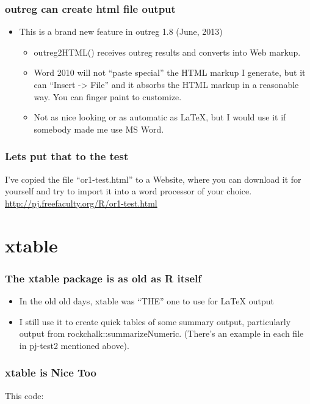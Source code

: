\documentclass[11pt,english]{beamer}
\def\lyxframeend{} %
\begin{document}
\begin{frame}
\frametitle{outreg can create html file output}
\begin{itemize}
\item This is a brand new feature in outreg 1.8 (June, 2013)

\begin{itemize}
\item outreg2HTML() receives outreg results and converts into Web markup.
\item Word 2010 will not ``paste special'' the HTML markup I generate,
but it can ``Insert -> File'' and it absorbs the HTML markup in
a reasonable way. You can finger paint to customize.
\item Not as nice looking or as automatic as \LaTeX{}, but I would use it
if somebody made me use MS Word.
\end{itemize}
\end{itemize}
\end{frame}

\begin{frame}
\frametitle{Lets put that to the test}



I've copied the file ``or1-test.html'' to a Website, where you can
download it for yourself and try to import it into a word processor
of your choice. \href{http://pj.freefaculty.org/R/or1-test.html}{http://pj.freefaculty.org/R/or1-test.html}

\end{frame}


\lyxframeend{}\section{xtable}

\begin{frame}
\frametitle{The xtable package is as old as R itself}
\begin{itemize}
\item In the old old days, xtable was ``THE'' one to use for \LaTeX{}
output
\item I still use it to create quick tables of some summary output, particularly
output from rockchalk::summarizeNumeric. (There's an example in each
file in pj-test2 mentioned above).
\end{itemize}
\end{frame}

\begin{frame}[containsverbatim]
\frametitle{xtable is Nice Too}


This code:



\end{frame}
\end{document}
